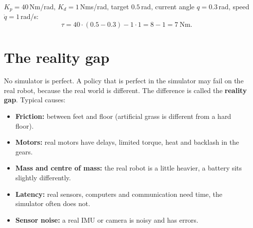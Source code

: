 \begin{example}
$K_p=40$\,Nm/rad, $K_d=1$\,Nms/rad, target $0.5$\,rad, current angle $q=0.3$\,rad, speed $\dot q=1$\,rad/s:
\[
\tau=40\cdot(0.5-0.3)-1\cdot1=8-1=7\ \text{Nm}.
\]
\end{example}

\begin{center}
\label{fig:rl6_chain}
\end{center}

\section*{The reality gap}
No simulator is perfect. A policy that is perfect in the simulator may fail on the real robot, because the real world is different. The difference is called the \textbf{reality gap}. Typical causes:
\begin{itemize}[nosep]
  \item \textbf{Friction:} between feet and floor (artificial grass is different from a hard floor).
  \item \textbf{Motors:} real motors have delays, limited torque, heat and backlash in the gears.
  \item \textbf{Mass and centre of mass:} the real robot is a little heavier, a battery sits slightly differently.
  \item \textbf{Latency:} real sensors, computers and communication need time, the simulator often does not.
  \item \textbf{Sensor noise:} a real IMU or camera is noisy and has errors.
\end{itemize}

